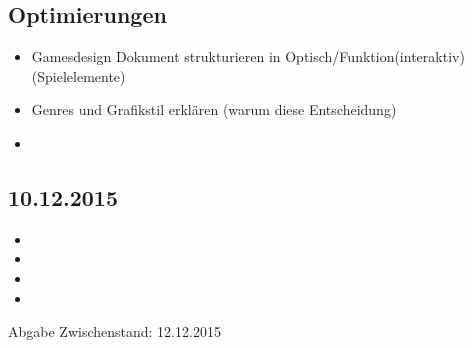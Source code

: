 \subsection{Optimierungen}
\begin{itemize}
\item Gamesdesign Dokument strukturieren in Optisch/Funktion(interaktiv) (Spielelemente)
\item Genres und Grafikstil erklären (warum diese Entscheidung)
\item 
\end{itemize}

\subsection{10.12.2015}
\begin{itemize}
\item 
\item 
\item 
\item 
\end{itemize}

Abgabe Zwischenstand: 12.12.2015


